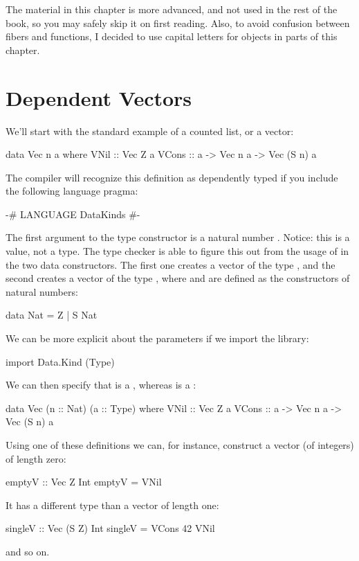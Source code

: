 \documentclass[DaoFP]{subfiles}
\begin{document}
The material in this chapter is more advanced, and not used in the rest of the book, so you may safely skip it on first reading. Also, to avoid confusion between fibers and functions, I decided to use capital letters for objects in parts of this chapter.

\section{Dependent Vectors}

We'll start with the standard example of a counted list, or a vector:
\begin{haskell}
data Vec n a where
    VNil  :: Vec Z a
    VCons :: a -> Vec n a -> Vec (S n) a
\end{haskell}
The compiler will recognize this definition as dependently typed if you include the following language pragma:
\begin{haskell}
{-# LANGUAGE DataKinds #-}
\end{haskell}
The first argument to the type constructor is a natural number . Notice: this is a value, not a type. The type checker is able to figure this out from the usage of  in the two data constructors. The first one creates a vector of the type , and the second creates a vector of the type , where  and  are defined as the constructors of natural numbers:
\begin{haskell}
data Nat = Z | S Nat
\end{haskell}

We can be more explicit about the parameters if we import the library:
\begin{haskell}
import Data.Kind (Type)
\end{haskell}
We can then specify that  is a , whereas  is a :
\begin{haskell}
data Vec (n :: Nat) (a :: Type) where
    VNil  :: Vec Z a
    VCons :: a -> Vec n a -> Vec (S n) a
\end{haskell}

Using one of these definitions we can, for instance, construct a vector (of integers) of length zero:
\begin{haskell}
emptyV :: Vec Z Int
emptyV = VNil
\end{haskell}
It has a different type than a vector of length one:
\begin{haskell}
singleV :: Vec (S Z) Int
singleV = VCons 42 VNil
\end{haskell}
and so on.
\end{document}
